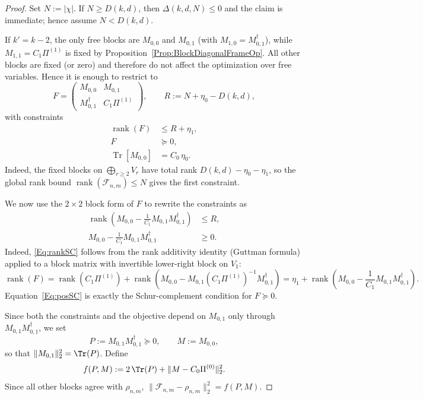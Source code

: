 \documentclass[aps,twocolumn,pra,superscriptaddress,nofootinbib]{revtex4-2}
\begin{document}
\begin{proof}
{Set $N:=|\chi|$. If $N\ge D(k,d)$, then $\Delta(k,d,N)\le0$ and the claim is immediate; hence assume $N<D(k,d)$.}

If $k'=k-2$, the only free blocks are $M_{0,0}$ and $M_{0,1}$ (with $M_{1,0}=M_{0,1}^\dagger$), while
$M_{1,1}=C_1\Pi^{(1)}$ is fixed by Proposition~\ref{Prop:BlockDiagonalFrameOp}. All other blocks are fixed (or zero) and therefore do not affect the optimization over free variables. Hence it is enough to restrict to
\[
F=\begin{pmatrix}
M_{0,0} & M_{0,1}\\
M_{0,1}^{\dagger} & C_{1}\Pi^{(1)}
\end{pmatrix},
\qquad
{R:=N+\eta_{0}-D(k,d),}
\]
with constraints
\begin{align}
\operatorname{rank}(F) &{\le R+\eta_1}, \\
F & \succeq 0, \\
\operatorname{Tr}[M_{0,0}] &= C_0\,\eta_0.
\end{align}
{Indeed, the fixed blocks on $\bigoplus_{r\ge2}V_r$ have total rank $D(k,d)-\eta_0-\eta_1$, so the global rank bound $\operatorname{rank}(\mathcal F_{n,m})\le N$ gives the first constraint.}

We now use the $2\times2$ block form of $F$ to rewrite the constraints as
\begin{align}
\operatorname{rank}\!\left(M_{0,0}-\frac{1}{C_{1}}M_{0,1}M_{0,1}^{\dagger}\right) &{\le R}, \label{Eq:rankSC}\\
M_{0,0}-\frac{1}{C_{1}}M_{0,1}M_{0,1}^{\dagger} &\ge 0. \label{Eq:posSC}
\end{align}
Indeed, \eqref{Eq:rankSC} follows from the rank additivity identity (Guttman formula) applied to a block matrix with invertible lower-right block on $V_1$:
\[
\operatorname{rank}(F)
=
\operatorname{rank}(C_1\Pi^{(1)})
+
\operatorname{rank}\!\left(M_{0,0}-M_{0,1}(C_1\Pi^{(1)})^{-1}M_{0,1}^\dagger\right)
=
\eta_1+\operatorname{rank}\!\left(M_{0,0}-\frac{1}{C_1}M_{0,1}M_{0,1}^\dagger\right).
\]
Equation~\eqref{Eq:posSC} is exactly the Schur-complement condition for $F\succeq0$.

Since both the constraints and the objective depend on $M_{0,1}$ only through $M_{0,1}M_{0,1}^{\dagger}$, we set
\[
P:=M_{0,1}M_{0,1}^{\dagger}\succeq0,\qquad M:=M_{0,0},
\]
so that $\|M_{0,1}\|_2^2=\Tr(P)$. Define
\[
f(P,M):=2\,\Tr(P)+\|M-C_0\Pi^{(0)}\|_2^2.
\]
Since all other blocks agree with $\rho_{n,m}$, {$\|\mathcal F_{n,m}-\rho_{n,m}\|_2^2=f(P,M)$.}


\end{proof}
\end{document}
